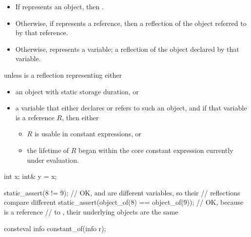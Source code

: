 \begin{itemdescr}
\pnum
\returns
\begin{itemize}
\item
  If  represents an object,
  then .
\item
  Otherwise, if  represents a reference,
  then a reflection of the object referred to by that reference.
\item
  Otherwise,  represents a variable;
  a reflection of the object declared by that variable.
\end{itemize}

\pnum
\throws
{} unless
 is a reflection representing either
\begin{itemize}
\item
  an object with static storage duration, or
\item
  a variable that either declares or refers to such an object,
  and if that variable is a reference $R$, then either
  \begin{itemize}
  \item
    $R$ is usable in constant expressions, or
  \item
    the lifetime of $R$ began within the core constant expression
    currently under evaluation.
  \end{itemize}
\end{itemize}

\pnum
\begin{example}
\begin{codeblock}
int x;
int& y = x;

static_assert(^^x != ^^y);                          // OK,  and  are different variables, so their
                                                    // reflections compare different
static_assert(object_of(^^x) == object_of(^^y));    // OK, because  is a reference
                                                    // to , their underlying objects are the same
\end{codeblock}
\end{example}
\end{itemdescr}

%
\begin{itemdecl}
consteval info constant_of(info r);
\end{itemdecl}

